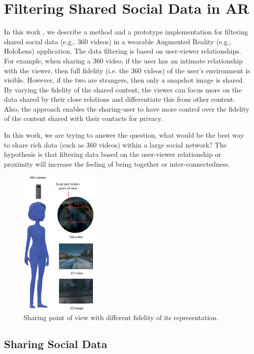\section{Filtering Shared Social Data in AR}
\label{sec:surrounding:360}

In this work \cite{Nassani2018a}, we describe a method and a prototype implementation for filtering shared social data (e.g., 360 videos) in a wearable Augmented Reality (e.g., HoloLens) application. The data filtering is based on user-viewer relationships. For example, when sharing a 360 video, if the user has an intimate relationship with the viewer, then full fidelity (i.e. the 360 videos) of the user's environment is visible. However, if the two are strangers, then only a snapshot image is shared. By varying the fidelity of the shared content, the viewer can focus more on the data shared by their close relations and differentiate this from other content. Also, the approach enables the sharing-user to have more control over the fidelity of the content shared with their contacts for privacy.

In this work, we are trying to answer the question, what would be the best way to share rich data (such as 360 videos) within a large social network? The hypothesis is that filtering data based on the user-viewer relationship or proximity will increase the feeling of being together or inter-connectedness. 

\begin{figure}[ht]
    \centering
    \includegraphics[width=1.5in]{images/chi/images-04.eps}
    \caption{Sharing point of view with different fidelity of its representation.}
    \label{fig:data:sharer}
\end{figure}

\subsection{Sharing Social Data}

